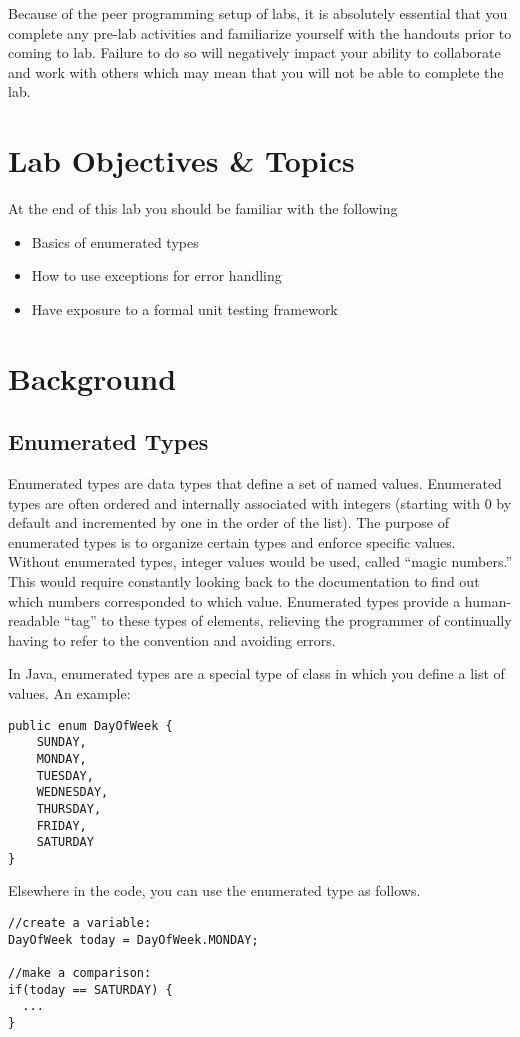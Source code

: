 \documentclass[12pt]{scrartcl}
\begin{document}
Because of the peer programming setup of labs, it is absolutely 
essential that you complete any pre-lab activities and familiarize
yourself with the handouts prior to coming to lab.  Failure to do
so will negatively impact your ability to collaborate and work with 
others which may mean that you will not be able to complete the
lab.  

\section{Lab Objectives \& Topics}
At the end of this lab you should be familiar with the following
\begin{itemize}
  \item Basics of enumerated types
  \item How to use exceptions for error handling
  \item Have exposure to a formal unit testing framework 
\end{itemize}

\section{Background}

\subsection*{Enumerated Types}

Enumerated types are data types that define a set of named values.  
Enumerated types are often ordered and internally associated with 
integers (starting with 0 by default and incremented by one in the 
order of the list).  The purpose of enumerated types is to organize 
certain types and enforce specific values.  Without enumerated types, 
integer values would be used, called ``magic numbers.''  This would 
require constantly looking back to the documentation to find out which
numbers corresponded to which value.  Enumerated types provide 
a human-readable ``tag'' to these types of elements, relieving the 
programmer of continually having to refer to the convention and avoiding 
errors.

In Java, enumerated types are a special type of class in which you
define a list of values. An example:

\begin{verbatim}
public enum DayOfWeek {
	SUNDAY,
	MONDAY,
	TUESDAY, 
	WEDNESDAY,
	THURSDAY,
	FRIDAY,
	SATURDAY
}
\end{verbatim}
Elsewhere in the code, you can use the enumerated type as follows.
\begin{verbatim}
//create a variable:
DayOfWeek today = DayOfWeek.MONDAY;

//make a comparison:
if(today == SATURDAY) {
  ...
}
\end{verbatim}
\end{document}
